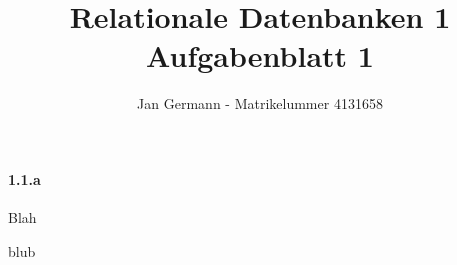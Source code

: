 \documentclass[12pt,a4paper,DIV=9]{scrartcl}
\author{Jan Germann - Matrikelummer 4131658}
\title{Relationale Datenbanken 1\\ Aufgabenblatt 1}
\begin{document}
\maketitle
\paragraph{1.1.a} %
\label{par:1_1_a}

\textrm{ 
Blah
}

blub
\end{document}
